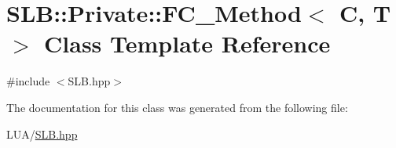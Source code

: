 \hypertarget{classSLB_1_1Private_1_1FC__Method}{}\section{S\+LB\+:\+:Private\+:\+:F\+C\+\_\+\+Method$<$ C, T $>$ Class Template Reference}
\label{classSLB_1_1Private_1_1FC__Method}


{\ttfamily \#include $<$S\+L\+B.\+hpp$>$}



The documentation for this class was generated from the following file\+:\begin{DoxyCompactItemize}
\item 
L\+U\+A/\hyperlink{SLB_8hpp}{S\+L\+B.\+hpp}\end{DoxyCompactItemize}
